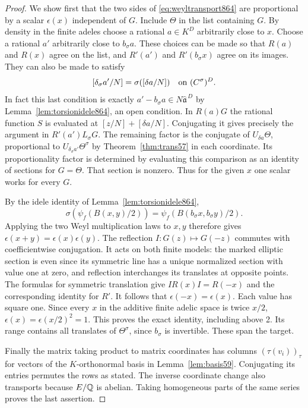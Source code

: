 \documentclass[a4paper,11pt]{article}
\theoremstyle{definition}
\theoremstyle{remark}
\numberwithin{equation}{section}
\begin{document}
\begin{proof}
We show first that the two sides of \eqref{eq:weyltransport864}
are proportional by a scalar \(\epsilon(x)\) independent of
\(G\). Include \(\Theta\) in the list containing \(G\).
By density in the finite adeles choose a rational \(a\in K^D\)
arbitrarily close to \(x\). Choose a rational \(a'\) arbitrarily
close to \(b_\sigma a\). These choices can be made so that \(R(a)\)
and \(R(x)\) agree on the list, and \(R'(a')\) and \(R'(b_\sigma x)\)
agree on its images. They can also be made to satisfy
\[
              [\delta_\sigma a'/N]=\sigma([\delta a/N])
                             \quad\hbox{on }(C^\sigma)^D .
\]
In fact this last condition is exactly
\(a'-b_\sigma a\in N\widehat{\mathfrak a}^{\,D}\) by
Lemma~\ref{lem:torsionidele864}, an open condition. In \(R(a)G\)
the rational function \(S\) is evaluated at
\([z/N]+[\delta a/N]\). Conjugating it gives precisely the
argument in \(R'(a')L_\sigma G\). The remaining factor is the
conjugate of \(U_{\delta a}\Theta\), proportional to
\(U_{\delta_\sigma a'}\Theta^\sigma\) by
Theorem~\ref{thm:trans57} in each coordinate. Its proportionality
factor is determined by evaluating this comparison as an
identity of sections for \(G=\Theta\). That section is nonzero.
Thus for the given \(x\) one scalar works for every \(G\).

By the idele identity of Lemma~\ref{lem:torsionidele864},
\[
 \sigma\!\left(\psi_f(B(x,y)/2)\right)
                   =\psi_f(B(b_\sigma x,b_\sigma y)/2).
\]
Applying the two Weyl multiplication laws to \(x,y\) therefore
gives \(\epsilon(x+y)=\epsilon(x)\epsilon(y)\).
The reflection \(I:G(z)\mapsto G(-z)\) commutes with
coefficientwise conjugation. It acts on both finite models:
the marked elliptic section is even since its symmetric line
has a unique normalized section with value one at zero, and
reflection interchanges its translates at opposite points.
The formulas for symmetric translation give
\(IR(x)I=R(-x)\) and the corresponding identity for \(R'\).
It follows that \(\epsilon(-x)=\epsilon(x)\). Each value has
square one. Since every \(x\) in the additive finite adelic
space is twice \(x/2\), \(\epsilon(x)=\epsilon(x/2)^2=1\).
This proves the exact identity, including above 2.
Its range contains all translates of \(\Theta^\sigma\), since
\(b_\sigma\) is invertible. These span the target.

Finally the matrix taking product to matrix coordinates has
columns \((\tau(v_i))_\tau\) for vectors of the \(K\)-orthonormal
basis in Lemma~\ref{lem:basis59}. Conjugating its entries
permutes the rows as stated. The inverse coordinate change
also transports because \(E/\mathbb Q\) is abelian. Taking homogeneous
parts of the same series proves the last assertion.
\end{proof}
\clearpage
\end{document}
